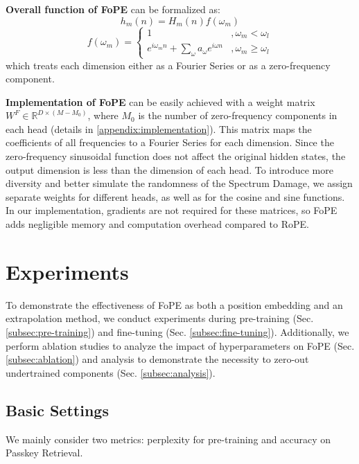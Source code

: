 \textbf{Overall function of FoPE} can be formalized as:
\begin{equation}
    h_m(n)=H_m(n)f(\omega_m)
\end{equation}
\begin{equation}
    f(\omega_m) = 
    \left\{
        \begin{array}{cc}
            1 & ,\omega_m < \omega_l \\
            e^{i\omega_m n}+\sum\limits_{\omega}a_{\omega} e^{i\omega n} & ,\omega_m \geq \omega_l
        \end{array}
    \right.
\end{equation}
which treats each dimension either as a Fourier Series or as a zero-frequency component.

\textbf{Implementation of FoPE} can be easily achieved with a weight matrix $W^F\in\mathbb{R}^{D \times (M-M_0)}$, where $M_0$ is the number of zero-frequency components in each head (details in \ref{appendix:implementation}). This matrix maps the coefficients of all frequencies to a Fourier Series for each dimension. 
Since the zero-frequency sinusoidal function does not affect the original hidden states, the output dimension is less than the dimension of each head. 
To introduce more diversity and better simulate the randomness of the Spectrum Damage, we assign separate weights for different heads, as well as for the cosine and sine functions. In our implementation, gradients are not required for these matrices, so FoPE adds negligible memory and computation overhead compared to RoPE.

\section{Experiments}
To demonstrate the effectiveness of FoPE as both a position embedding and an extrapolation method, we conduct experiments during pre-training (Sec. \ref{subsec:pre-training}) and fine-tuning (Sec. \ref{subsec:fine-tuning}). Additionally, we perform ablation studies to analyze the impact of hyperparameters on FoPE (Sec. \ref{subsec:ablation}) and analysis to demonstrate the necessity to zero-out undertrained components (Sec. \ref{subsec:analysis}).

\subsection{Basic Settings}
We mainly consider two metrics: perplexity for pre-training and accuracy on Passkey Retrieval.


